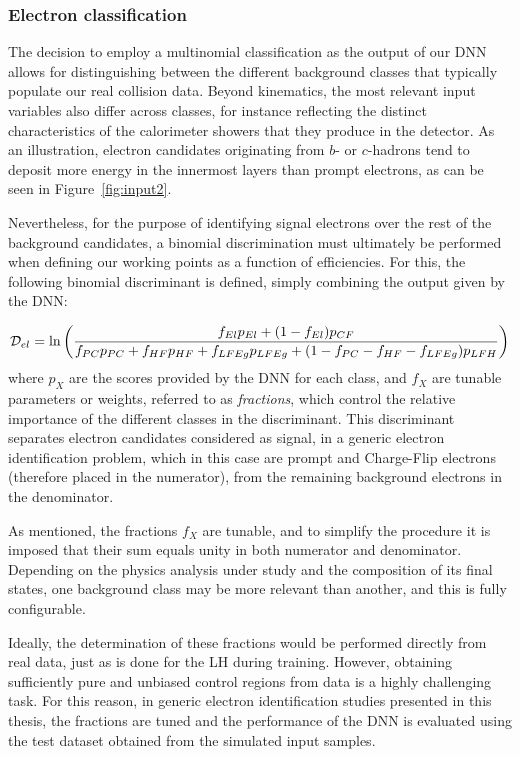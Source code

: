 \subsubsection{Electron classification}

The decision to employ a multinomial classification as the output of our DNN allows for distinguishing between the different background classes that typically populate our real collision data. Beyond kinematics, the most relevant input variables also differ across classes, for instance reflecting the distinct characteristics of the calorimeter showers that they produce in the detector. As an illustration, electron candidates originating from $b$- or $c$-hadrons tend to deposit more energy in the innermost layers than prompt electrons, as can be seen in Figure~\ref{fig:input2}.

Nevertheless, for the purpose of identifying signal electrons over the rest of the background candidates, a binomial discrimination must ultimately be performed when defining our working points as a function of efficiencies.  
For this, the following binomial discriminant is defined, simply combining the output given by the DNN:

\begin{equation}
  \small
  \mathcal{D}_{el} = \ln\left(\frac{f_{El}p_{El} + (1-f_{El})p_{CF}}{f_{PC}p_{PC}+f_{HF}p_{HF}+f_{LFEg}p_{LFEg}+(1-f_{PC}-f_{HF}-f_{LFEg})p_{LFH}}\right)
\label{eq:dnn_discriminant}
\end{equation}
where $p_{X}$ are the scores provided by the DNN for each class, and $f_{X}$ are tunable parameters or weights, referred to as \textit{fractions}, which control the relative importance of the different classes in the discriminant.  
This discriminant separates electron candidates considered as signal, in a generic electron identification problem, which in this case are prompt and Charge-Flip electrons (therefore placed in the numerator), from the remaining background electrons in the denominator.

As mentioned, the fractions $f_{X}$ are tunable, and to simplify the procedure it is imposed that their sum equals unity in both numerator and denominator. Depending on the physics analysis under study and the composition of its final states, one background class may be more relevant than another, and this is fully configurable.

Ideally, the determination of these fractions would be performed directly from real data, just as is done for the LH during training. However, obtaining sufficiently pure and unbiased control regions from data is a highly challenging task.
For this reason, in generic electron identification studies presented in this thesis, the fractions are tuned and the performance of the DNN is evaluated using the test dataset obtained from the simulated input samples. 

